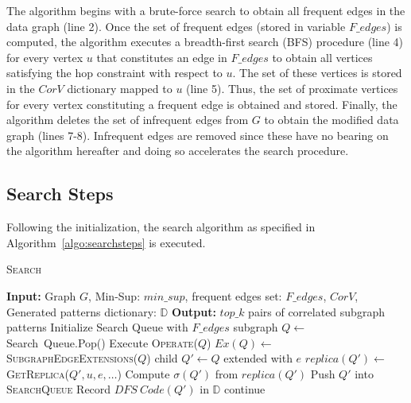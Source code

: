The algorithm begins with a brute-force search to obtain all frequent edges in
the data graph (line 2). Once the set of frequent edges (stored in variable
$F\_edges$) is computed, the algorithm executes a breadth-first search (BFS)
procedure (line 4) for every vertex $u$ that constitutes an edge in $F\_edges$
to obtain all vertices satisfying the hop constraint with respect to $u$. The
set of these vertices is stored in the $CorV$ dictionary mapped to $u$ (line 5).
Thus, the set of proximate vertices for every vertex constituting a frequent
edge is obtained and stored. Finally, the algorithm deletes the set of
infrequent edges from $G$ to obtain the modified data graph (lines 7-8).
Infrequent edges are removed since these have no bearing on the algorithm
hereafter and doing so accelerates the search procedure.

\subsection{Search Steps}
\label{subsec:search-steps}
Following the initialization, the search algorithm as specified in
Algorithm~\ref{algo:searchsteps} is executed.
\begin{algorithm}
	\dontprintsemicolon
	\caption{\textsc{Search}}\label{algo:searchsteps}
	\nonl \textbf{Input:} Graph $G$, {\sf Min-Sup:} $min\_sup$, frequent edges
	set: $F\_edges$, $CorV$, Generated patterns dictionary: $\mathbb{D}$ \;
	\nonl \textbf{Output:} $top\_k$ pairs of correlated subgraph patterns  \;
	Initialize {\sf Search Queue} with $F\_edges$ \; 
	{
		subgraph $Q \leftarrow$ {\sf Search\
		Queue.Pop()}\; 
		Execute \textsc{Operate($Q$)}\; 
		$Ex(Q) \leftarrow $ \textsc{SubgraphEdgeExtensions($Q$)}\; 
		{
			child $Q'\leftarrow Q$ extended with $e$\; 
			{
				$replica(Q') \leftarrow $ \textsc{GetReplica($Q', u, e, \dots$)}\;
				Compute $\sigma(Q')$ from $replica(Q')$\;
				{
					Push $Q'$ into \textsc{SearchQueue}\;
				}
				Record $DFS\ Code(Q')$ in $\mathbb{D}$\;
			}
			\Else
			{
				continue\;
			}
		}
	}
		\;
\end{algorithm}

